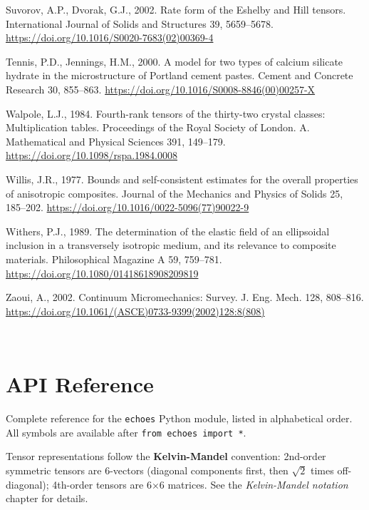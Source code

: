 \documentclass[
  a4paper,
  numbers=noendperiod,
  DIV=12]{scrreprt}
\newlength{\cslhangindent}
\newenvironment{CSLReferences}[2] %
 {\begin{list}{}{%
  \setlength{\itemindent}{0pt}
  \setlength{\leftmargin}{0pt}
  \setlength{\parsep}{0pt}
  \ifodd #1
   \setlength{\leftmargin}{\cslhangindent}
   \setlength{\itemindent}{-1\cslhangindent}
  \fi
  \setlength{\itemsep}{#2\baselineskip}}}
 {\end{list}}
\begin{document}
\begin{CSLReferences}{1}{0}
Suvorov, A.P., Dvorak, G.J., 2002. Rate form of the {Eshelby} and {Hill}
tensors. International Journal of Solids and Structures 39, 5659--5678.
\url{https://doi.org/10.1016/S0020-7683(02)00369-4}

Tennis, P.D., Jennings, H.M., 2000. A model for two types of calcium
silicate hydrate in the microstructure of {Portland} cement pastes.
Cement and Concrete Research 30, 855--863.
\url{https://doi.org/10.1016/S0008-8846(00)00257-X}

Walpole, L.J., 1984. Fourth-rank tensors of the thirty-two crystal
classes: Multiplication tables. Proceedings of the Royal Society of
London. A. Mathematical and Physical Sciences 391, 149--179.
\url{https://doi.org/10.1098/rspa.1984.0008}

Willis, J.R., 1977. Bounds and self-consistent estimates for the overall
properties of anisotropic composites. Journal of the Mechanics and
Physics of Solids 25, 185--202.
\url{https://doi.org/10.1016/0022-5096(77)90022-9}

Withers, P.J., 1989. The determination of the elastic field of an
ellipsoidal inclusion in a transversely isotropic medium, and its
relevance to composite materials. Philosophical Magazine A 59, 759--781.
\url{https://doi.org/10.1080/01418618908209819}

Zaoui, A., 2002. Continuum {Micromechanics}: {Survey}. J. Eng. Mech.
128, 808--816.
\url{https://doi.org/10.1061/(ASCE)0733-9399(2002)128:8(808)}

\end{CSLReferences}

\(\,\)


\chapter{API Reference}\label{sec-api}

Complete reference for the \texttt{echoes} Python module, listed in
alphabetical order. All symbols are available after
\texttt{from\ echoes\ import\ *}.

Tensor representations follow the \textbf{Kelvin-Mandel} convention:
2nd-order symmetric tensors are 6-vectors (diagonal components first,
then \(\sqrt2\) times off-diagonal); 4th-order tensors are 6×6 matrices.
See the \emph{Kelvin-Mandel notation} chapter for details.
\end{document}
